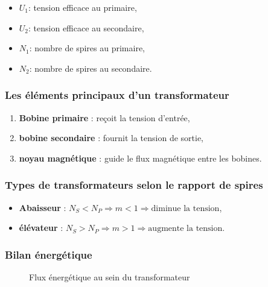 \documentclass[french, 12pt]{article}
\begin{document}
\begin{itemize}
	\item \textbf{$U_1$}: tension efficace au primaire,
	\item \textbf{$U_2$}: tension efficace au secondaire,
	\item \textbf{$N_1$}: nombre de spires au primaire,
	\item \textbf{$N_2$}: nombre de spires au secondaire.
\end{itemize}

\subsubsection{Les éléments principaux d’un transformateur}

\begin{enumerate}
	\item \textbf{Bobine primaire} : reçoit la tension d’entrée,
	\item \textbf{bobine secondaire} : fournit la tension de sortie,
	\item \textbf{noyau magnétique} : guide le flux magnétique entre les bobines.
\end{enumerate}

\subsubsection{Types de transformateurs selon le rapport de spires}

\begin{itemize}
	\item \textbf{Abaisseur} : $ N_S < N_P \Longrightarrow m < 1 \Longrightarrow \text{diminue la tension} $,
	\item \textbf{élévateur} : $ N_S > N_P \Longrightarrow m > 1 \Longrightarrow \text{augmente la tension} $.
\end{itemize}

\subsubsection{Bilan énergétique}

\begin{figure}[H]
	\centering
	\caption{Flux énergétique au sein du transformateur}
\end{figure}
\end{document}
